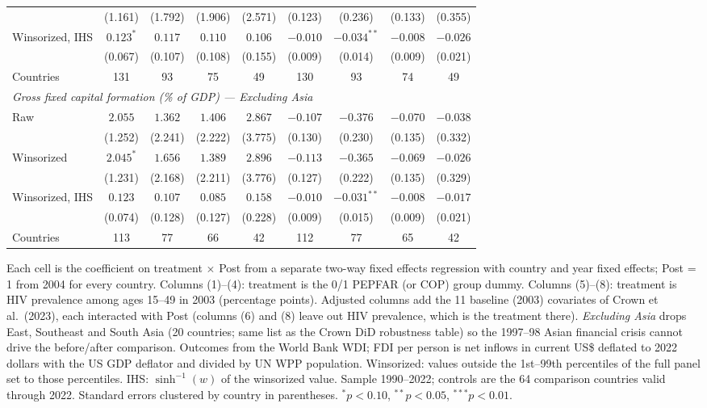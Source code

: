 \begin{table}[htbp]
{\begin{tabular}{lcccccccc}
 & (1.161) & (1.792) & (1.906) & (2.571) & (0.123) & (0.236) & (0.133) & (0.355) \\
Winsorized, IHS & $0.123^{*}$ & $0.117$ & $0.110$ & $0.106$ & $-0.010$ & $-0.034^{**}$ & $-0.008$ & $-0.026$ \\
 & (0.067) & (0.107) & (0.108) & (0.155) & (0.009) & (0.014) & (0.009) & (0.021) \\
Countries & 131 & 93 & 75 & 49 & 130 & 93 & 74 & 49 \\
\midrule
\multicolumn{9}{l}{\textit{Gross fixed capital formation (\% of GDP) --- Excluding Asia}} \\
Raw & $2.055$ & $1.362$ & $1.406$ & $2.867$ & $-0.107$ & $-0.376$ & $-0.070$ & $-0.038$ \\
 & (1.252) & (2.241) & (2.222) & (3.775) & (0.130) & (0.230) & (0.135) & (0.332) \\
Winsorized & $2.045^{*}$ & $1.656$ & $1.389$ & $2.896$ & $-0.113$ & $-0.365$ & $-0.069$ & $-0.026$ \\
 & (1.231) & (2.168) & (2.211) & (3.776) & (0.127) & (0.222) & (0.135) & (0.329) \\
Winsorized, IHS & $0.123$ & $0.107$ & $0.085$ & $0.158$ & $-0.010$ & $-0.031^{**}$ & $-0.008$ & $-0.017$ \\
 & (0.074) & (0.128) & (0.127) & (0.228) & (0.009) & (0.015) & (0.009) & (0.021) \\
Countries & 113 & 77 & 66 & 42 & 112 & 77 & 65 & 42 \\
\bottomrule
\end{tabular}}
\par\vspace{4pt}
\begin{minipage}{\textwidth}\footnotesize Each cell is the coefficient on treatment $\times$ Post from a separate two-way fixed effects regression with country and year fixed effects; Post = 1 from 2004 for every country. Columns (1)--(4): treatment is the 0/1 PEPFAR (or COP) group dummy. Columns (5)--(8): treatment is HIV prevalence among ages 15--49 in 2003 (percentage points). Adjusted columns add the 11 baseline (2003) covariates of Crown et al.\ (2023), each interacted with Post (columns (6) and (8) leave out HIV prevalence, which is the treatment there). \textit{Excluding Asia} drops East, Southeast and South Asia (20 countries; same list as the Crown DiD robustness table) so the 1997--98 Asian financial crisis cannot drive the before/after comparison. Outcomes from the World Bank WDI; FDI per person is net inflows in current US\$ deflated to 2022 dollars with the US GDP deflator and divided by UN WPP population. Winsorized: values outside the 1st--99th percentiles of the full panel set to those percentiles. IHS: $\sinh^{-1}(w)$ of the winsorized value. Sample 1990--2022; controls are the 64 comparison countries valid through 2022. Standard errors clustered by country in parentheses. $^{*}p<0.10$, $^{**}p<0.05$, $^{***}p<0.01$.\end{minipage}
\end{table}
